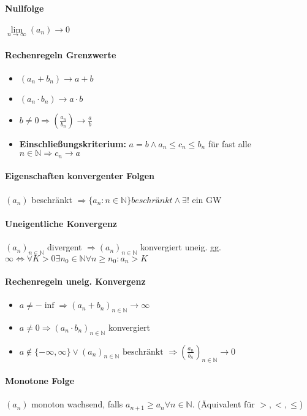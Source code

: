\documentclass[paper=a4,paper=landscape, fontsize=6pt,DIV=25, twoside]{scrartcl}
\newcommand{\nat}{\mathbb{N}}
\newcommand{\aseq}{(a_n)_{n \in \nat}}
\begin{document}
\begin{multicols*}{4}
		\paragraph{Nullfolge}
		$\lim\limits_{n \rightarrow \infty} (a_n) \rightarrow 0$
		\paragraph{Rechenregeln Grenzwerte}
			\begin{itemize}
				\item $(a_n+b_n) \rightarrow a+b$
				\item $(a_n \cdot b_n) \rightarrow a \cdot b$
				\item $b \neq 0 \Rightarrow (\frac{a_n}{b_n}) \rightarrow \frac{a}{b}$
				\item \textbf{Einschließungskriterium:} $a=b \wedge a_n \leq c_n \leq b_n$ für fast alle $n \in \nat \Rightarrow c_n \rightarrow a$
			\end{itemize}
		\paragraph{Eigenschaften konvergenter Folgen}
		$(a_n)$ beschränkt $\Rightarrow \{a_n : n \in \nat\} beschränkt \wedge \exists! \text{ ein GW}$
		\paragraph{Uneigentliche Konvergenz}
		$\aseq$ divergent $\Rightarrow\aseq$ konvergiert uneig. gg. $\infty \Leftrightarrow \forall K > 0 \exists n_0 \in \nat \forall n \geq n_0: a_n > K$
		\paragraph{Rechenregeln uneig. Konvergenz}
			\begin{itemize}
				\item $a \neq -\inf \Rightarrow (a_n+b_n)_{n \in \nat} \rightarrow \infty$
				\item $a \neq 0 \Rightarrow (a_n \cdot b_n)_{n \in \nat}$ konvergiert
				\item $a \notin \{-\infty, \infty\} \vee\aseq \text{ beschränkt } \Rightarrow (\frac{a_n}{b_n})_{n \in \nat} \rightarrow 0$
			\end{itemize}
		\paragraph{Monotone Folge}
			$(a_n)$ monoton wachsend, falls $a_{n+1} \geq a_n \forall n \in \nat$. (Äquivalent für $>,<,\leq$)

\end{multicols*}
\end{document}
